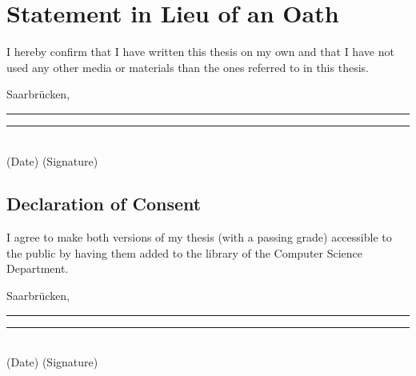 \chapter*{Statement in Lieu of an Oath}

I hereby confirm that I have written this thesis on my own and that I
have not used any other media or materials than the ones referred to in
this thesis.

\vspace{2.5cm}

\noindent
Saarbr\"ucken, \rule{4cm}{0.4pt} \hfill \rule{6cm}{0.4pt}\\
\phantom{Saarbr\"ucken, }(Date) \hfill (Signature)

\vspace{3cm}

\section*{Declaration of Consent}

I agree to make both versions of my thesis (with a passing grade)
accessible to the public by having them added to the library of the
Computer Science Department.

\vspace{2.5cm}

\noindent
Saarbr\"ucken, \rule{4cm}{0.4pt} \hfill \rule{6cm}{0.4pt}\\
\phantom{Saarbr\"ucken, }(Date) \hfill (Signature)
